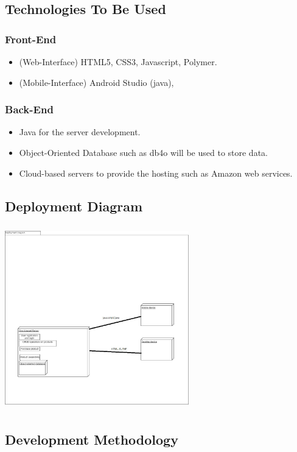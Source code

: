 \documentclass[11pt]{article}
\begin{document}
\subsection{Technologies To Be Used}
\subsubsection{Front-End}
\begin{itemize}
\item (Web-Interface) HTML5, CSS3, Javascript, Polymer.
\item (Mobile-Interface) Android Studio (java), 
\end{itemize}
\subsubsection{Back-End}
\begin{itemize}
\item Java for the server development.
\item Object-Oriented Database such as db4o will be used to store data.
\item Cloud-based servers to provide the hosting such as Amazon web services.
\end{itemize}
\subsection{Deployment Diagram}
\begin{center}
 \includegraphics[width=8cm, height=8cm]{Images/purchaseManagementDeploymentDiagram.jpg}\\[1cm]
\end{center}
\subsection{Development Methodology}
\end{document}
